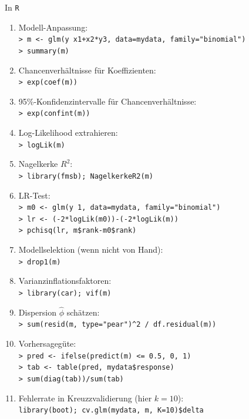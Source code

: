 \begin{frame}[allowframebreaks]
  {In \texttt{R}}
  \small
  \begin{enumerate}[<+->]
    \item Modell-Anpassung:\\
      \texttt{> m <- glm(y~x1+x2*y3, data=mydata, family="binomial")}\\
      \texttt{> summary(m)}
    \item Chancenverhältnisse für Koeffizienten:\\
      \texttt{> exp(coef(m))}
    \item 95\%-Konfidenzintervalle für Chancenverhältnisse:\\
      \texttt{> exp(confint(m))}
    \item Log-Likelihood extrahieren:\\
      \texttt{> logLik(m)}
    \item Nagelkerke $R^2$:\\
      \texttt{> library(fmsb); NagelkerkeR2(m)}
    \item LR-Test:\\
      \texttt{> m0 <- glm(y~1, data=mydata, family="binomial")}\\
      \texttt{> lr <- (-2*logLik(m0))-(-2*logLik(m))}\\
      \texttt{> pchisq(lr, m\$rank-m0\$rank)}
    \item Modellselektion (wenn nicht von Hand):\\
      \texttt{> drop1(m)}
    \item Varianzinflationsfaktoren:\\
      \texttt{> library(car); vif(m)}
    \item Dispersion $\hat{\phi}$ schätzen:\\
      \texttt{> sum(resid(m, type="pear")\^{}2 / df.residual(m))}
    \item Vorhersagegüte:\\
      \texttt{> pred <- ifelse(predict(m) <= 0.5, 0, 1)}\\
      \texttt{> tab  <- table(pred, mydata\$response)}\\
      \texttt{> sum(diag(tab))/sum(tab)}
    \item Fehlerrate in Kreuzzvalidierung (hier $k=10$):\\
      \texttt{library(boot); cv.glm(mydata, m, K=10)\$delta}
  \end{enumerate}
\end{frame}



